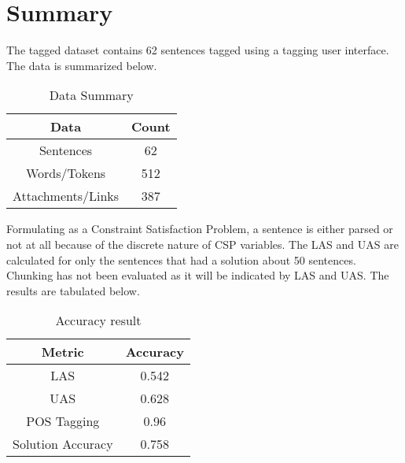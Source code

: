 \normalfont

\section{Summary}
The tagged dataset contains 62 sentences tagged using a tagging user interface.
The data is summarized below.
\begin{table}[h]
    \begin{center}
        \begin{tabular}{|c|c|}
            \hline
            \textbf{Data} & \textbf{Count} \\
            \hline
            Sentences & 62 \\
            \hline
            Words/Tokens & 512 \\
            \hline
            Attachments/Links & 387 \\
            \hline
        \end{tabular}
    \end{center}
    \caption{Data Summary}
    \label{table:data_summary}
\end{table}
Formulating as a Constraint Satisfaction Problem, a sentence is either parsed
or not at all because of the discrete nature of CSP variables. The LAS  and UAS are calculated for
only the sentences that had a solution \textendash { } about 50 sentences.
Chunking has not been evaluated as it will be indicated by LAS and UAS.
The results are tabulated below.
\begin{table}[h]
    \begin{center}
        \begin{tabular}{|c|c|}
            \hline
            \textbf{Metric} & \textbf{Accuracy} \\
            \hline
            LAS & 0.542 \\
            \hline
            UAS & 0.628 \\
            \hline
            POS Tagging & 0.96 \\
            \hline
            Solution Accuracy & 0.758 \\
            \hline
        \end{tabular}
    \end{center}
    \caption{Accuracy result}
    \label{table:accuracy_result}
\end{table}

